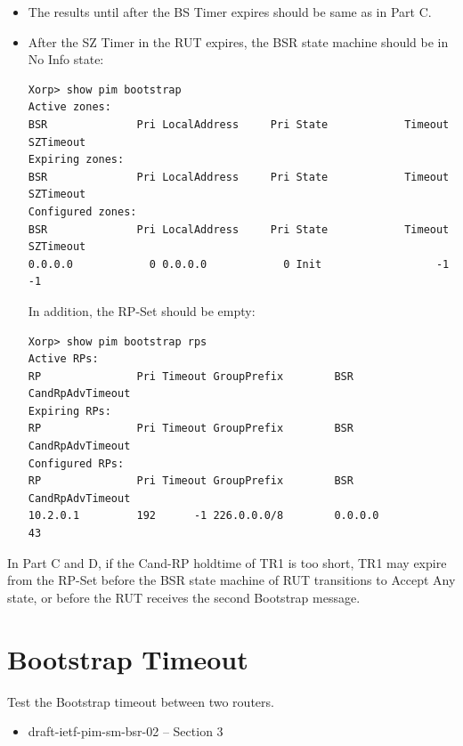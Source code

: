 \documentclass[11pt]{report}
\begin{document}
\begin{itemize}

  \item The results until after the BS Timer expires should be same as in Part
  C.

  \item After the SZ Timer in the RUT expires, the BSR state machine should be
  in No Info state:

\begin{verbatim}
Xorp> show pim bootstrap 
Active zones:
BSR              Pri LocalAddress     Pri State            Timeout SZTimeout
Expiring zones:
BSR              Pri LocalAddress     Pri State            Timeout SZTimeout
Configured zones:
BSR              Pri LocalAddress     Pri State            Timeout SZTimeout
0.0.0.0            0 0.0.0.0            0 Init                  -1        -1
\end{verbatim}

  In addition, the RP-Set should be empty:

\begin{verbatim}
Xorp> show pim bootstrap rps 
Active RPs:
RP               Pri Timeout GroupPrefix        BSR         CandRpAdvTimeout
Expiring RPs:
RP               Pri Timeout GroupPrefix        BSR         CandRpAdvTimeout
Configured RPs:
RP               Pri Timeout GroupPrefix        BSR         CandRpAdvTimeout
10.2.0.1         192      -1 226.0.0.0/8        0.0.0.0                   43
\end{verbatim}

\end{itemize}


In Part C and D, if the Cand-RP holdtime of TR1 is too short, TR1 may expire
from the RP-Set before the BSR state machine of RUT transitions to Accept Any
state, or before the RUT receives the second Bootstrap message.


\newpage
\section{Bootstrap Timeout}

Test the Bootstrap timeout between two routers.

\begin{itemize}
  \item draft-ietf-pim-sm-bsr-02 -- Section 3
\end{itemize}
\end{document}
